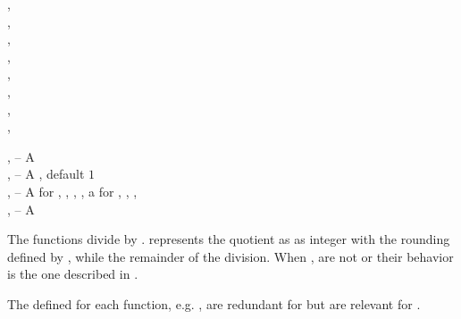 \documentclass[../Exponentials-Logarithms-Trigonometry.tex]{subfiles}
\begin{document}

\DSyntax{}

    \RArrow
{}, \\
    \RArrow
{}, \\
    \RArrow
{}, \\
    \RArrow
{}, \\
    \RArrow
{}, \\
    \RArrow
{}, \\
    \RArrow
{}, \\
    \RArrow
{}, \\

\DArgsNValues{}

,  -- A \\
,  -- A , default $1$\\
,  -- A  for , ,
, , a  for ,
, , \\
,  -- A \\

\DDescription{}

The functions divide  by .  represents the
quotient as as integer with the rounding defined by
\cite{1996:ANSIHyperSpec}, while  the remainder of the division. When
,  are not  or 
their behavior is the one described in \cite{1996:ANSIHyperSpec}.

\noindent
The  defined for each function, e.g. , are
redundant for  but are relevant for .
\end{document}
